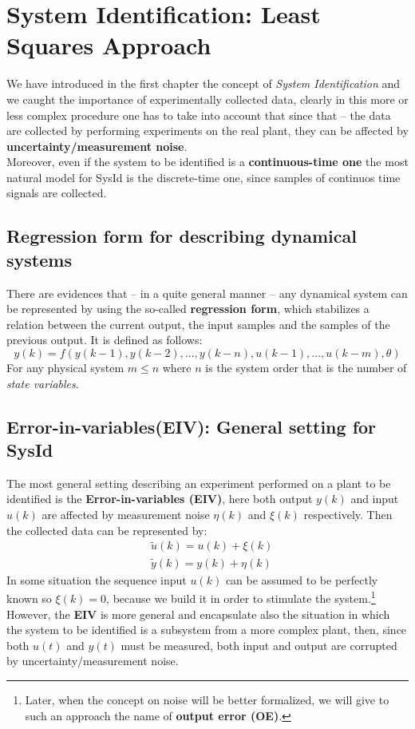 \chapter{System Identification: Least Squares Approach}

We have introduced in the first chapter the concept of \textit{System Identification} and we caught the importance of experimentally collected data, clearly in this more or less complex procedure one has to take into account that since that -- the data are collected by performing experiments on the real plant, they can be affected by \textbf{uncertainty/measurement noise}.\\
Moreover, even if the system to be identified  is a \textbf{continuous-time one} the most natural model for SysId is the discrete-time one, since samples of continuos time signals are collected.

\section{Regression form for describing dynamical systems}
There are evidences that -- in a quite general manner -- any dynamical system can be represented by using the so-called \textbf{regression form}, which stabilizes a relation between the current output, the input samples and the samples of the previous output. It is defined as follows:
\begin{equation}    \label{eq:reg_form}
    y(k)=f(y(k-1), y(k-2),  ..., y(k-n), u(k-1), ..., u(k-m), \theta)
\end{equation}
For any physical system $m\le{n}$ where $n$ is the system order that is the number of \textit{state variables}.

\section{Error-in-variables(EIV): General setting for SysId}
The most general setting describing an experiment performed on a plant to be identified is the \textbf{Error-in-variables (EIV)}, here both output $y(k)$ and input $u(k)$ are affected by measurement noise $\eta(k)$ and $\xi(k)$ respectively. Then the collected data can be represented by:
\begin{align} 
    &\tilde{u}(k) = u(k) + \xi(k)\\
    &\tilde{y}(k) = y(k) + \eta(k)
\end{align} 
In some situation the sequence input $u(k)$ can be assumed to be perfectly known so $\xi(k)=0$, because we build it in order to stimulate the system.\footnote{
    Later, when the concept on noise will be better formalized, we will give to such an approach the name of \textbf{output error (OE)}.
}
However, the \textbf{EIV} is more general and encapsulate also the situation in which the system to be identified is a subsystem from a more complex plant, then, since both $u(t)$ and $y(t)$ must be measured, both input and output are corrupted  by uncertainty/measurement noise. 

